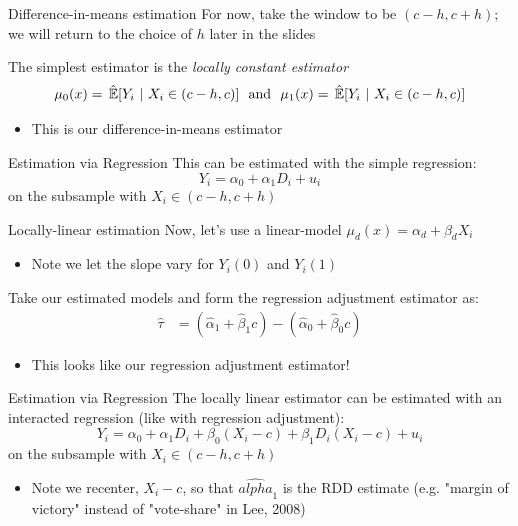 \documentclass[aspectratio=169,t,11pt,table]{beamer}
\begin{document}

\begin{frame}{Difference-in-means estimation}{}
  For now, take the window to be $(c-h, c+h)$; we will return to the choice of $h$ later in the slides

  \bigskip
  The simplest estimator is the \emph{locally constant estimator}
  $$
    \mu_0(x) = \expechat{Y_i}{X_i \in (c-h, c)} \ \text{ and }\ \mu_1(x) = \expechat{Y_i}{X_i \in (c-h, c)}
  $$
  \begin{itemize}
    \item This is our difference-in-means estimator
  \end{itemize}
\end{frame}

\begin{frame}{Estimation via Regression}{}
  This can be estimated with the simple regression:
  $$
    Y_i = \alpha_0 + \alpha_1 D_i + u_i
  $$
  on the subsample with $X_i \in (c-h, c+h)$
\end{frame}


\begin{frame}{Locally-linear estimation}{}
  Now, let's use a linear-model $\mu_d(x) = \alpha_d + \beta_d X_i$
  \begin{itemize}
    \item Note we let the slope vary for $Y_i(0)$ and $Y_i(1)$
  \end{itemize}

  \bigskip
  Take our estimated models and form the regression adjustment estimator as:
  \begin{align*}
    \hat{\tau} 
    &= \left( \hat{\alpha}_1 + \hat{\beta}_1 c \right) - \left( \hat{\alpha}_0 + \hat{\beta}_0 c \right)
  \end{align*}
  \begin{itemize}
    \item This looks like our regression adjustment estimator!
  \end{itemize}
\end{frame}

\begin{frame}{Estimation via Regression}{}
  The locally linear estimator can be estimated with an interacted regression (like with regression adjustment):
  $$
    Y_i = \alpha_0 + \alpha_1 D_i + \beta_0 (X_i - c) + \beta_1 D_i (X_i - c) + u_i
  $$
  on the subsample with $X_i \in (c-h, c+h)$

  \begin{itemize}
    \item Note we recenter, $X_i - c$, so that $\hat{alpha}_1$ is the RDD estimate (e.g. "margin of victory" instead of "vote-share" in Lee, 2008)
  \end{itemize}
\end{frame}
\end{document}
